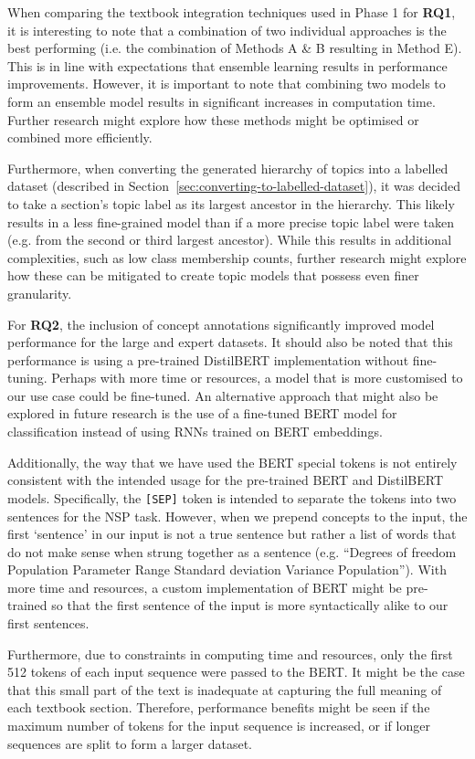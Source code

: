 \documentclass[twocolumn]{article}
\def\code#1{\texttt{#1}}
\begin{document}
When comparing the textbook integration techniques used in Phase 1 for \textbf{RQ1}, it is interesting to note that a combination of two individual approaches is the best performing (i.e. the combination of Methods A \& B resulting in Method E). This is in line with expectations that ensemble learning results in performance improvements. However, it is important to note that combining two models to form an ensemble model results in significant increases in computation time. Further research might explore how these methods might be optimised or combined more efficiently.

Furthermore, when converting the generated hierarchy of topics into a labelled dataset (described in  Section~\ref{sec:converting-to-labelled-dataset}), it was decided to take a section's topic label as its largest ancestor in the hierarchy. This likely results in a less fine-grained model than if a more precise topic label were taken (e.g. from the second or third largest ancestor). While this results in additional complexities, such as low class membership counts, further research might explore how these can be mitigated to create topic models that possess even finer granularity.

For \textbf{RQ2}, the inclusion of concept annotations significantly improved model performance for the large and expert datasets. It should also be noted that this performance is using a pre-trained DistilBERT implementation without fine-tuning. Perhaps with more time or resources, a model that is more customised to our use case could be fine-tuned. An alternative approach that might also be explored in future research is the use of a fine-tuned BERT model for classification instead of using RNNs trained on BERT embeddings.

Additionally, the way that we have used the BERT special tokens is not entirely consistent with the intended usage for the pre-trained BERT and DistilBERT models. Specifically, the \code{[SEP]} token is intended to separate the tokens into two sentences for the NSP task. However, when we prepend concepts to the input, the first `sentence' in our input is not a true sentence but rather a list of words that do not make sense when strung together as a sentence (e.g. ``Degrees of freedom Population Parameter Range Standard deviation Variance Population''). With more time and resources, a custom implementation of BERT might be pre-trained so that the first sentence of the input is more syntactically alike to our first sentences.

Furthermore, due to constraints in computing time and resources, only the first 512 tokens of each input sequence were passed to the BERT. It might be the case that this small part of the text is inadequate at capturing the full meaning of each textbook section. Therefore, performance benefits might be seen if the maximum number of tokens for the input sequence is increased, or if longer sequences are split to form a larger dataset.
\end{document}
